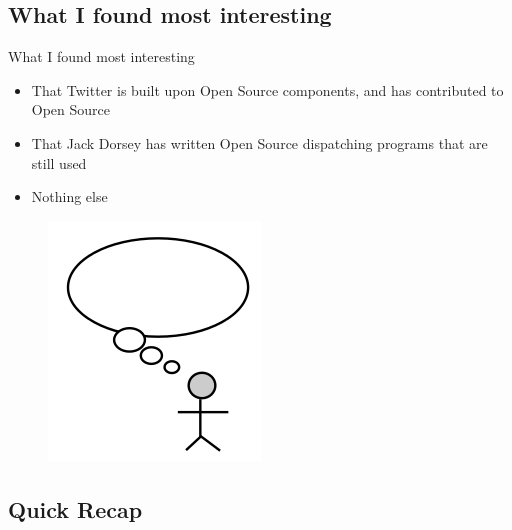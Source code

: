 \documentclass[xcolor=svgnames,handout]{beamer}
\begin{document}
\subsection{What I found most interesting}
\begin{frame}{What I found most interesting}
	\begin{itemize}
		\item That Twitter is built upon Open Source components, and has contributed to Open Source
		\item That Jack Dorsey has written Open Source dispatching programs that are still used~\cite{markglaser2007}
		\item Nothing else
	\end{itemize}
	\begin{figure}[h]
		\centering
		\includegraphics[scale=0.25]{thought-bubble.png}
		\caption{\cite{lucidish2012}}
	\end{figure}
\end{frame}

\subsection{Quick Recap}
\end{document}
